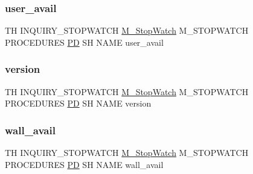 \subsubsection{\texorpdfstring{user\+\_\+avail}{user\_avail}}
{\footnotesize\ttfamily TH I\+N\+Q\+U\+I\+R\+Y\+\_\+\+S\+T\+O\+P\+W\+A\+T\+CH \hyperlink{option__stopwatch_83_8txt_aa2011fc45a5e502e87ee50996a8a9305}{M\+\_\+\+Stop\+Watch} M\+\_\+\+S\+T\+O\+P\+W\+A\+T\+CH P\+R\+O\+C\+E\+D\+U\+R\+ES \hyperlink{what__overview_81_8txt_a85f26da5a4481fbdb0d9c79f2b94de3e}{PD} SH N\+A\+ME user\+\_\+avail}

\mbox{\label{inquiry__stopwatch_83_8txt_aee378be19d20935dd436517beda00ee4}} 
\subsubsection{\texorpdfstring{version}{version}}
{\footnotesize\ttfamily TH I\+N\+Q\+U\+I\+R\+Y\+\_\+\+S\+T\+O\+P\+W\+A\+T\+CH \hyperlink{option__stopwatch_83_8txt_aa2011fc45a5e502e87ee50996a8a9305}{M\+\_\+\+Stop\+Watch} M\+\_\+\+S\+T\+O\+P\+W\+A\+T\+CH P\+R\+O\+C\+E\+D\+U\+R\+ES \hyperlink{what__overview_81_8txt_a85f26da5a4481fbdb0d9c79f2b94de3e}{PD} SH N\+A\+ME version}

\mbox{\label{inquiry__stopwatch_83_8txt_a73da37f4d5799996a833d139d422cef8}} 
\subsubsection{\texorpdfstring{wall\+\_\+avail}{wall\_avail}}
{\footnotesize\ttfamily TH I\+N\+Q\+U\+I\+R\+Y\+\_\+\+S\+T\+O\+P\+W\+A\+T\+CH \hyperlink{option__stopwatch_83_8txt_aa2011fc45a5e502e87ee50996a8a9305}{M\+\_\+\+Stop\+Watch} M\+\_\+\+S\+T\+O\+P\+W\+A\+T\+CH P\+R\+O\+C\+E\+D\+U\+R\+ES \hyperlink{what__overview_81_8txt_a85f26da5a4481fbdb0d9c79f2b94de3e}{PD} SH N\+A\+ME wall\+\_\+avail}

\mbox{\label{inquiry__stopwatch_83_8txt_a5ff5c1fe3dd4df4b4c88053f0182e09d}} 
